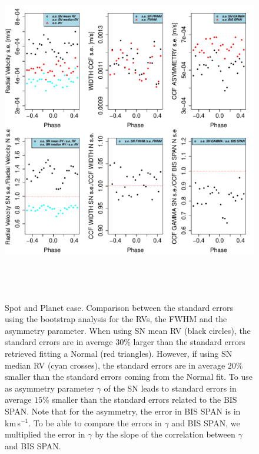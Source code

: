 \documentclass[11pt, oneside]{article}
\def\kms{\hbox{\,km\,s$^{-1}$}}       %
\begin{document}
\begin{figure}[htbp]
   \centering
\includegraphics[height = 6in]{RV_comparison_SPOT_PLANET_standard_errors.pdf} 
   \caption{Spot and Planet case. Comparison between the standard errors using the bootstrap analysis for the RVs, the FWHM and the asymmetry parameter. When using SN mean RV (black circles), the standard errors are in average $30\%$ larger than the standard errors retrieved fitting a Normal (red triangles). However, if using SN median RV (cyan crosses), the standard errors are in average $20\%$ smaller than the standard errors coming from the Normal fit. To use as asymmetry parameter $\gamma$ of the SN leads to standard errors in average $15\%$ smaller than the standard errors related to the BIS SPAN. Note that for the asymmetry, the error in BIS SPAN is in \kms. To be able to compare the errors in $\gamma$ and BIS SPAN, we multiplied the error in $\gamma$ by the slope of the correlation between $\gamma$ and BIS SPAN.}
   \label{fig:se.soap.spot.planet}
\end{figure}
\end{document}
